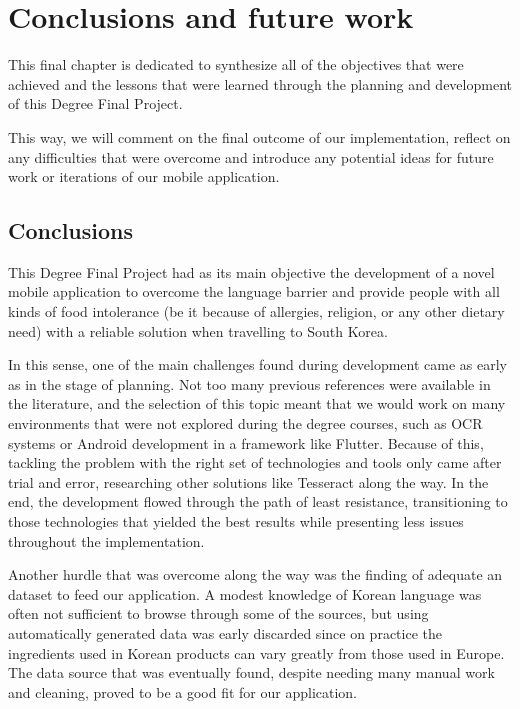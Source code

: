 \chapter{Conclusions and future work}
\label{chapter8}

This final chapter is dedicated to synthesize all of the objectives that were achieved and the lessons that were learned through the planning and development of this Degree Final Project.

This way, we will comment on the final outcome of our implementation, reflect on any difficulties that were overcome and introduce any potential ideas for future work or iterations of our mobile application.

\section{Conclusions}

This Degree Final Project had as its main objective the development of a novel mobile application to overcome the language barrier and provide people with all kinds of food intolerance (be it because of allergies, religion, or any other dietary need) with a reliable solution when travelling to South Korea. 

In this sense, one of the main challenges found during development came as early as in the stage of planning. Not too many previous references were available in the literature, and the selection of this topic meant that we would work on many environments that were not explored during the degree courses, such as OCR systems or Android development in a framework like Flutter. Because of this, tackling the problem with the right set of technologies and tools only came after trial and error, researching other solutions like Tesseract \cite{noauthor_tesseract_2021} along the way. In the end, the development flowed through the path of least resistance, transitioning to those technologies that yielded the best results while presenting less issues throughout the implementation.

Another hurdle that was overcome along the way was the finding of adequate an dataset to feed our application. A modest knowledge of Korean language was often not sufficient to browse through some of the sources, but using automatically generated data was early discarded since on practice the ingredients used in Korean products can vary greatly from those used in Europe. The data source that was eventually found, despite needing many manual work and cleaning, proved to be a good fit for our application.

